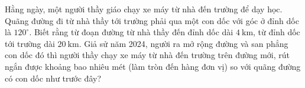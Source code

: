 \begin{bt}%
	Hằng ngày, một người thầy giáo chạy xe máy từ nhà đến trường để dạy học. Quãng đường đi từ nhà thầy tới trường phải qua một con dốc với góc ở đỉnh dốc là $120^\circ$. Biết rằng từ đoạn đường từ nhà thầy đến đỉnh dốc dài $4~\text{km}$, từ đỉnh dốc tới trường dài $20~\text{km}$. Giả sử năm 2024, người ra mở rộng đường và san phẳng con dốc đó thì người thầy chạy xe máy từ nhà đến trường trên đường mới, rút ngắn được khoảng bao nhiêu mét (làm tròn đến hàng đơn vị) so với quãng đường có con dốc như trước đây?
\end{bt}

